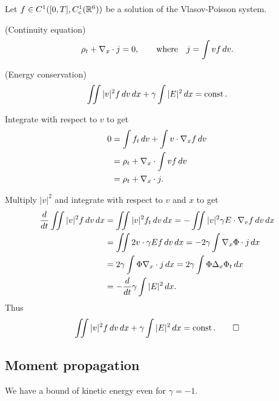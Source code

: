 \documentclass[11pt]{amsart}
\begin{document}
\begin{lem}
Let $f\in C^1([0,T],C_c^1(\mathbb{R}^6))$ be a solution of the Vlasov-Poisson system.
\begin{cond}
\item(Continuity equation)
\[\rho_t+\nabla_x\cdot j=0,\qquad\text{where}\quad j=\int vf\,dv.\]
\item(Energy conservation)
\[\iint|v|^2f\,dv\,dx+\gamma\int|E|^2\,dx=\operatorname{const}.\]
\end{cond}
\end{lem}
\begin{pfs}
\item
Integrate with respect to $v$ to get
\begin{align*}
0&=\int f_t\,dv+\int v\cdot\nabla_xf\,dv\\
&=\rho_t+\nabla_x\cdot\int vf\,dv\\
&=\rho_t+\nabla_x\cdot j.
\end{align*}
\item
Multiply $|v|^2$ and integrate with respect to $v$ and $x$ to get
\begin{align*}
\dd{t}\iint|v|^2f\,dv\,dx
&=\iint|v|^2f_t\,dv\,dx=-\iint|v|^2\gamma E\cdot\del_vf\,dv\,dx\\
&=\iint2v\cdot\gamma Ef\,dv\,dx=-2\gamma\int\del_x\Phi\cdot j\,dx\\
&=2\gamma\int\Phi\del_x\cdot j\,dx=2\gamma\int\Phi\Delta_x\Phi_t\,dx\\
&=-\dd{t}\gamma\int|E|^2\,dx.
\end{align*}
Thus
\[\iint|v|^2f\,dv\,dx+\gamma\int|E|^2\,dx=\operatorname{const}.\qedhere\]
\end{pfs}



\subsection{Moment propagation}

We have a bound of kinetic energy even for $\gamma=-1$.
\end{document}
